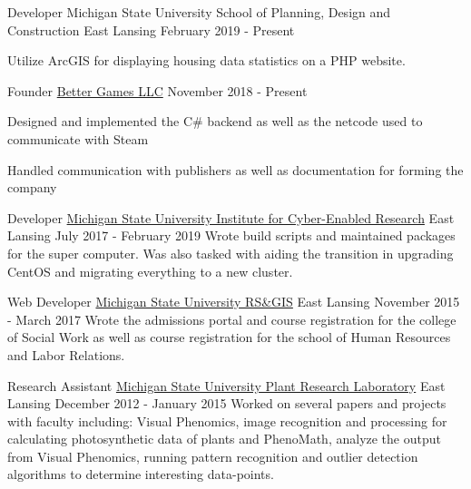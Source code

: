 
\begin{cventries}
  \cventry
  {Developer}
  {Michigan State University School of Planning, Design and Construction}
  {East Lansing}
  {February 2019 - Present}
  {
    \begin{cvitems}
      \item {Utilize ArcGIS for displaying housing data statistics on a PHP website.}
    \end{cvitems}
  }

  \cventry
    {Founder} %
    {\href{https://better-games.org}{Better Games LLC}} %
    {} %
    {November 2018 - Present} %
    {
        \begin{cvitems}
          \item {Designed and implemented the C\# backend as well as the netcode used to communicate with Steam}
          \item {Handled communication with publishers as well as documentation for forming the company}
        \end{cvitems}
    }

  \cventry
    {Developer}
    {\href{https://icer.msu.edu}{Michigan State University Institute for Cyber-Enabled Research}}
    {East Lansing}
    {July 2017 - February 2019}
    {
        {Wrote build scripts and maintained packages for the super computer. Was also tasked with aiding the transition
        in upgrading CentOS and migrating everything to a new cluster.}
    }

  \cventry
    {Web Developer}
    {\href{http://www.rsgis.msu.edu}{Michigan State University RS\&GIS}}
    {East Lansing}
    {November 2015 - March 2017}
    {
      {Wrote the admissions portal and course registration for the college of Social Work as well as
      course registration for the school of Human Resources and Labor Relations.}
    }

  \cventry
    {Research Assistant}
    {\href{https://prl.natsci.msu.edu/research-tech/center-for-advanced-algal-and-plant-phenotyping}{Michigan State University Plant Research Laboratory}}
    {East Lansing}
    {December 2012 - January 2015}
    {
      {Worked on several papers and projects with faculty including: Visual Phenomics, image recognition
      and processing for calculating photosynthetic data of plants and PhenoMath, analyze the output from Visual Phenomics,
      running pattern recognition and outlier detection algorithms to determine interesting data-points. }
    }
\end{cventries}
